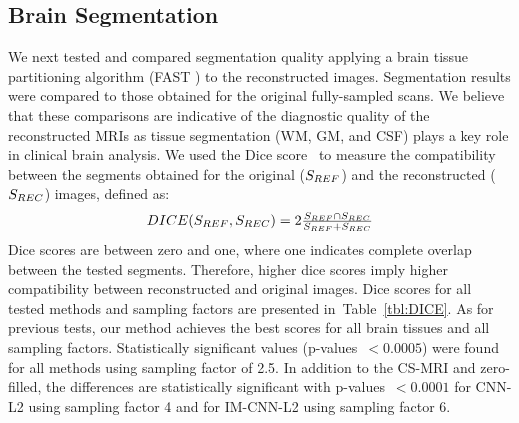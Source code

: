 \documentclass[10pt,journal,compsoc]{IEEEtran}
\begin{document}
%


\subsection{Brain Segmentation}
We next tested and compared segmentation quality applying a brain tissue partitioning algorithm (FAST \cite{zhang2001segmentation}) to the reconstructed images. Segmentation results were compared to those obtained for the original fully-sampled scans. We believe that these comparisons are indicative of the diagnostic quality of the reconstructed MRIs as tissue segmentation (WM, GM, and CSF) plays a key role in clinical brain analysis.
We used the Dice score~\cite{dice1945measures} to measure the compatibility between the segments obtained for the original ($S_{\mbox{\tiny{REF}}}$) and the reconstructed ($S_{\mbox{\tiny{REC}}}$) images, defined as:
\begin{equation}
\begin{array}{c}
DICE(S_{\mbox{\tiny{REF}}}, S_{\mbox{\tiny{REC}}}) = 2\frac{S_{\mbox{\tiny{REF}}} \cap S_{\mbox{\tiny{REC}}}}{S_{\mbox{\tiny{REF}}} + S_{\mbox{\tiny{REC}}}}
\end{array}
\end{equation}
Dice scores are between zero and one, where one indicates complete overlap between the tested segments. Therefore, higher dice scores imply higher compatibility between reconstructed and original images.
Dice scores for all tested methods and sampling factors are presented in~Table~\ref{tbl:DICE}. As for previous tests, our method achieves the best scores for all brain tissues and all sampling factors. Statistically significant values (p-values~$<0.0005$) were found for all methods using sampling factor of 2.5. In addition to the CS-MRI and zero-filled, the differences are statistically significant with p-values~$<0.0001$ for CNN-L2 using sampling factor 4 and for IM-CNN-L2 using sampling factor 6.
\end{document}
